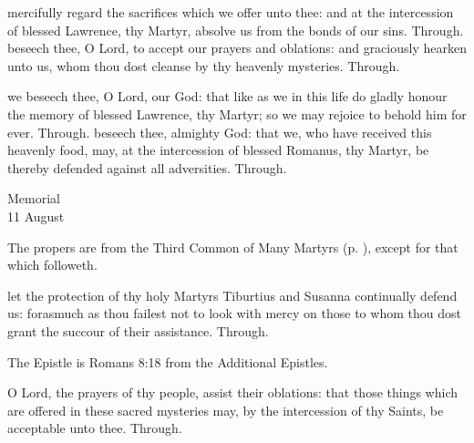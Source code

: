
\secret
{} mercifully regard the sacrifices which we offer unto thee: and at the intercession of blessed Lawrence, thy Martyr, absolve us from the bonds of our sins. Through.
 beseech thee, O Lord, to accept our prayers and oblations: and graciously hearken unto us, whom thou dost cleanse by thy heavenly mysteries. Through.


\postcommunion
{} we beseech thee, O Lord, our God: that like as we in this life do gladly honour the memory of blessed Lawrence, thy Martyr; so we may rejoice to behold him for ever. Through.
 beseech thee, almighty God: that we, who have received this heavenly food, may, at the intercession of blessed Romanus, thy Martyr, be thereby defended against all adversities. Through.



\begin{inhead}
    {Memorial\\
11 August}
\end{inhead}
\begin{rubric}
	The propers are from the Third Common of Many Martyrs (p. \pageref{CommonMartyrsIII}), except for that which followeth.
\end{rubric}

\collect
{} let the protection of thy holy Martyrs Tiburtius and Susanna continually defend us: forasmuch as thou failest not to look with mercy on those to whom thou dost grant the succour of their assistance. Through.

\begin{rubric}
	The Epistle is Romans 8:18 from the Additional Epistles.
\end{rubric}

\secret
{} O Lord, the prayers of thy people, assist their oblations: that those things which are offered in these sacred mysteries may, by the intercession of thy Saints, be acceptable unto thee. Through.

